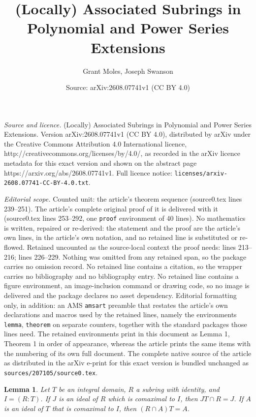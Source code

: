 \documentclass[10pt,a4paper]{amsart}
\title{(Locally) Associated Subrings in Polynomial and Power Series Extensions}
\author{Grant Moles, Joseph Swanson}
\date{Source: arXiv:2608.07741v1 (CC BY 4.0)}
\newtheorem{lemma}{Lemma}
\begin{document}
\maketitle

\noindent\emph{Source and licence.} (Locally) Associated Subrings in Polynomial and Power Series Extensions. Version arXiv:2608.07741v1 (CC BY 4.0), distributed by arXiv under the Creative Commons Attribution 4.0 International licence, http://creativecommons.org/licenses/by/4.0/, as recorded in the arXiv licence metadata for this exact version and shown on the abstract page https://arxiv.org/abs/2608.07741v1. Full licence notice: \texttt{licenses/arxiv-2608.07741-CC-BY-4.0.txt}.\par\smallskip

\noindent\textit{Editorial scope.} Counted unit: the article's theorem sequence (source0.tex lines 239--251). The article's complete original proof of it is delivered with it (source0.tex lines 253--292, one \texttt{proof} environment of 40 lines). No mathematics is written, repaired or re-derived: the statement and the proof are the article's own lines, in the article's own notation, and no retained line is substituted or re-flowed.  Retained uncounted as the source-local context the proof needs: lines 213--216; lines 226--229.  Nothing was omitted from any retained span, so the package carries no omission record.  No retained line contains a citation, so the wrapper carries no bibliography and no bibliography entry.  No retained line contains a figure environment, an image-inclusion command or drawing code, so no image is delivered and the package declares no asset dependency.  Editorial formatting only, in addition: an AMS \texttt{amsart} preamble that restates the article's own declarations and macros used by the retained lines, namely the environments \texttt{lemma}, \texttt{theorem} on separate counters, together with the standard packages those lines need.  The retained environments print in this document as Lemma 1, Theorem 1 in order of appearance, whereas the article prints the same items with the numbering of its own full document.  The complete native source of the article as distributed in the arXiv e-print for this exact version is bundled unchanged as \texttt{sources/207105/source0.tex}.
\begin{lemma}
    \label{going up or going down}
    Let $T$ be an integral domain, $R$ a subring with identity, and $I=(R:T)$. If $J$ is an ideal of $R$ which is comaximal to $I$, then $JT\cap R=J$. If $A$ is an ideal of $T$ that is comaximal to $I$, then $(R\cap A)T=A$.
\end{lemma}
\end{document}

